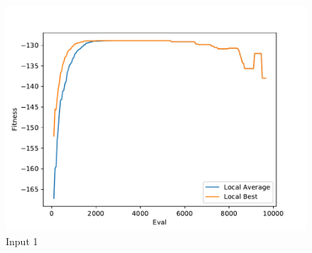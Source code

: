 \documentclass{standalone}
\begin{document}
\begin{figure}[!htb]
	\caption{Input 1}
	\label{fig:graph_1079}
	\includegraphics[width=\textwidth]{../graphs/graphs/1079.pdf}
\end{figure}
\end{document}
